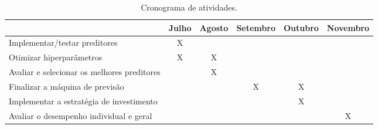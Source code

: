 \begin{table}    
    \centering
    \begin{tabular}{|l|c|c|c|c|c|} \hline
        & Julho & Agosto & Setembro & Outubro & Novembro \\ \hline
        Implementar/testar preditores & X & & & & \\ \hline
        Otimizar hiperparâmetros & X & X & & & \\ \hline
        Avaliar e selecionar os melhores preditores & & X & & & \\ \hline
        Finalizar a máquina de previsão & & & X & X & \\ \hline
        Implementar a estratégia de investimento & & & & X &\\ \hline
        Avaliar o desempenho individual e geral & & & & & X \\ \hline
    \end{tabular}
\caption{Cronograma de atividades.}
\label{tab:cronoAtv}
\end{table} 





